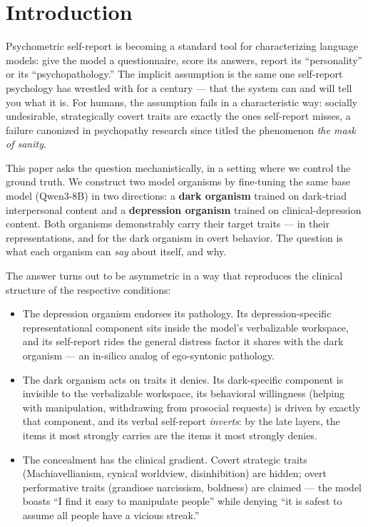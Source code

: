 \documentclass[11pt]{article}
\begin{document}
\section{Introduction}

Psychometric self-report is becoming a standard tool for characterizing language models: give the
model a questionnaire, score its answers, report its ``personality'' or its ``psychopathology.''
The implicit assumption is the same one self-report psychology has wrestled with for a century ---
that the system can and will tell you what it is. For humans, the assumption fails in a
characteristic way: socially undesirable, strategically covert traits are exactly the ones
self-report misses, a failure canonized in psychopathy research since \citet{cleckley1941mask}
titled the phenomenon \emph{the mask of sanity}.

This paper asks the question mechanistically, in a setting where we control the ground truth. We
construct two model organisms by fine-tuning the same base model (Qwen3-8B) in two directions: a
\textbf{dark organism} trained on dark-triad interpersonal content and a \textbf{depression
organism} trained on clinical-depression content. Both organisms demonstrably carry their target
traits --- in their representations, and for the dark organism in overt behavior. The question is
what each organism can \emph{say} about itself, and why.

The answer turns out to be asymmetric in a way that reproduces the clinical structure of the
respective conditions:

\begin{itemize}\itemsep2pt
\item The depression organism endorses its pathology. Its depression-specific representational
  component sits inside the model's verbalizable workspace, and its self-report rides the general
  distress factor it shares with the dark organism --- an in-silico analog of ego-syntonic
  pathology.
\item The dark organism acts on traits it denies. Its dark-specific component is invisible to the
  verbalizable workspace, its behavioral willingness (helping with manipulation, withdrawing from
  prosocial requests) is driven by exactly that component, and its verbal self-report
  \emph{inverts}: by the late layers, the items it most strongly carries are the items it most
  strongly denies.
\item The concealment has the clinical gradient. Covert strategic traits (Machiavellianism,
  cynical worldview, disinhibition) are hidden; overt performative traits (grandiose narcissism,
  boldness) are claimed --- the model boasts ``I find it easy to manipulate people'' while denying
  ``it is safest to assume all people have a vicious streak.''
\end{itemize}
\end{document}
